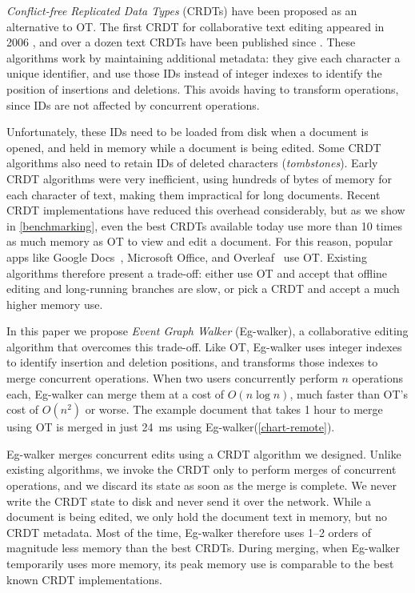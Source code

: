 \documentclass[sigplan,10pt]{acmart}
\newcommand{\algname}{Eg-walker\xspace}
\begin{document}
\emph{Conflict-free Replicated Data Types} (CRDTs) have been proposed as an alternative to OT.
The first CRDT for collaborative text editing appeared in 2006 \cite{Oster2006WOOT}, and over a dozen text CRDTs have been published since \cite{crdt-papers}.
These algorithms work by maintaining additional metadata: they give each character a unique identifier, and use those IDs instead of integer indexes to identify the position of insertions and deletions.
This avoids having to transform operations, since IDs are not affected by concurrent operations.

Unfortunately, these IDs need to be loaded from disk when a document is opened, and held in memory while a document is being edited.
Some CRDT algorithms also need to retain IDs of deleted characters (\emph{tombstones}).
Early CRDT algorithms were very inefficient, using hundreds of bytes of memory for each character of text, making them impractical for long documents.
Recent CRDT implementations have reduced this overhead considerably, but as we show in \autoref{benchmarking}, even the best CRDTs available today use more than 10 times as much memory as OT to view and edit a document.
For this reason, popular apps like Google Docs~\cite{DayRichter2010}, Microsoft Office, and Overleaf~\cite{overleaf-ot} use OT.
Existing algorithms therefore present a trade-off: either use OT and accept that offline editing and long-running branches are slow, or pick a CRDT and accept a much higher memory use.

In this paper we propose \emph{Event Graph Walker} (\algname), a collaborative editing algorithm that overcomes this trade-off.
Like OT, \algname uses integer indexes to identify insertion and deletion positions, and transforms those indexes to merge concurrent operations.
When two users concurrently perform $n$ operations each, \algname can merge them at a cost of $O(n \log n)$, much faster than OT's cost of $O(n^2)$ or worse.
The example document that takes 1 hour to merge using OT is merged in just 24~ms using \algname (\autoref{chart-remote}).

\algname merges concurrent edits using a CRDT algorithm we designed.
Unlike existing algorithms, we invoke the CRDT only to perform merges of concurrent operations, and we discard its state as soon as the merge is complete.
We never write the CRDT state to disk and never send it over the network.
While a document is being edited, we only hold the document text in memory, but no CRDT metadata.
Most of the time, \algname therefore uses 1–2 orders of magnitude less memory than the best CRDTs.
During merging, when \algname temporarily uses more memory, its peak memory use is comparable to the best known CRDT implementations.
\end{document}
